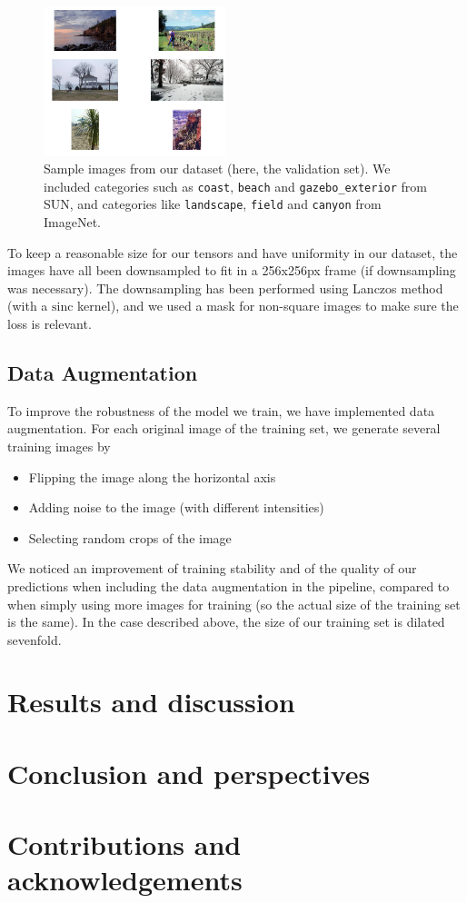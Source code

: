 \documentclass[10pt,twocolumn,letterpaper]{article}
\begin{document}
\begin{figure}
\begin{center}
\includegraphics[width=200px]{sampletrain.png}
\caption{Sample images from our dataset (here, the validation set). We included categories such as \texttt{coast}, \texttt{beach} and \texttt{gazebo\_exterior} from SUN, and categories like \texttt{landscape}, \texttt{field} and \texttt{canyon} from ImageNet.}
\label{sampletrain}
\end{center}
\end{figure}

To keep a reasonable size for our tensors and have uniformity in our dataset, the images have all been downsampled to fit in a 256x256px frame (if downsampling was necessary). The downsampling has been performed using Lanczos method (with a $\text{sinc}$ kernel), and we used a mask for non-square images to make sure the loss is relevant. 

\subsection{Data Augmentation}

To improve the robustness of the model we train, we have implemented data augmentation. For each original image of the training set, we generate several training images by 
\begin{itemize}
\item Flipping the image along the horizontal axis
\item Adding noise to the image (with different intensities)
\item Selecting random crops of the image
\end{itemize}

We noticed an improvement of training stability and of the quality of our predictions when including the data augmentation in the pipeline, compared to when simply using more images for training (so the actual size of the training set is the same). In the case described above, the size of our training set is dilated sevenfold.

\section{Results and discussion}
\section{Conclusion and perspectives}
\section*{Contributions and acknowledgements}


{\small


}
\end{document}
